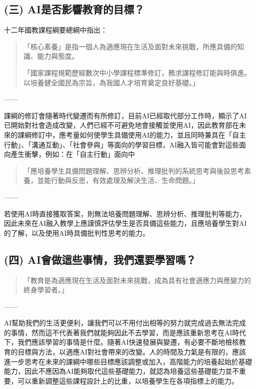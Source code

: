 \subsection{(三) AI是否影響教育的目標？}\label{sec:結論三}

十二年國教課程綱要總綱中指出：

\begin{quote}
「核心素養」是指一個人為適應現在生活及面對未來挑戰，所應具備的知識、能力與態度。

「國家課程規範歷經數次中小學課程標準修訂，務求課程修訂能與時俱進。以培養健全國民為宗旨，為我國人才培育奠定良好基礎。」
\end{quote}——\cite{moe2021curriculum}

課綱的修訂會隨著時代變遷而有所修訂，目前AI已經取代部分工作時，顯示了AI已開始對社會造成改變，人們已經不可避免地會接觸並使用AI，因此教育部在未來的課綱修訂中，應考量如何使學生具備使用AI的能力，並且同時兼具在「自主行動」、「溝通互動」、「社會參與」等面向的學習目標，AI融入皆可能會對這些面向產生衝擊，例如：在「自主行動」面向中

\begin{quote}
「應培養學生具備問題理解、思辨分析、推理批判的系統思考與後設思考素養，並能行動與反思，有效處理及解決生活、生命問題。」
\end{quote}——\cite{moe2021curriculum}

若使用AI時直接獲取答案，則無法培養問題理解、思辨分析、推理批判等能力，因此未來在AI融入教學上應謹慎評估學生是否具備這些能力，且應培養學生對AI的了解，以及使用AI時具備批判性思考的能力。

\subsection{(四) AI會做這些事情，我們還要學習嗎？}\label{sec:結論四}

\begin{quote}
「教育是為適應現在生活及面對未來挑戰，成為具有社會適應力與應變力的終身學習者。」
\end{quote}——\cite{moe2021curriculum}

AI幫助我們的生活更便利，讓我們可以不用付出相等的努力就完成過去無法完成的事情，然而這不代表著我們就能夠因此不去學習，而是應該重新思考在AI時代下，我們應該學習的事情是什麼。隨著AI快速發展與變遷，有必要不斷地檢核教育的目標與方法，以適應AI對社會帶來的改變。人的時間及力氣是有限的，應該進一步思考在未來的課綱中哪些目標應該調整或加入，高階能力的培養起始於基礎能力，因此不應因為AI能夠取代這些基礎能力，就認為培養這些基礎能力並不重要，可以重新調整這些課程設計上的比重，以培養學生在各項指標上的能力。


